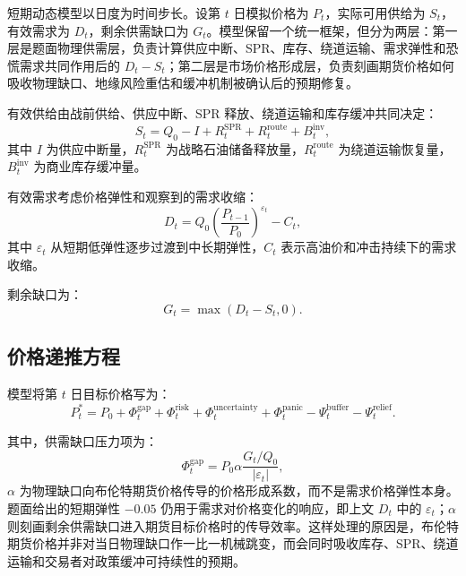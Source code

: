 \documentclass[UTF8,zihao=-4,fontset=fandol]{ctexart}
\begin{document}
短期动态模型以日度为时间步长。设第 \(t\) 日模拟价格为 \(P_t\)，实际可用供给为 \(S_t\)，有效需求为 \(D_t\)，剩余供需缺口为 \(G_t\)。模型保留一个统一框架，但分为两层：第一层是题面物理供需层，负责计算供应中断、SPR、库存、绕道运输、需求弹性和恐慌需求共同作用后的 \(D_t-S_t\)；第二层是市场价格形成层，负责刻画期货价格如何吸收物理缺口、地缘风险重估和缓冲机制被确认后的预期修复。

有效供给由战前供给、供应中断、SPR 释放、绕道运输和库存缓冲共同决定：
\begin{equation}
S_t
  =
  Q_0
  -
  I
  +
  R_t^{\mathrm{SPR}}
  +
  R_t^{\mathrm{route}}
  +
  B_t^{\mathrm{inv}},
\end{equation}
其中 \(I\) 为供应中断量，\(R_t^{\mathrm{SPR}}\) 为战略石油储备释放量，\(R_t^{\mathrm{route}}\) 为绕道运输恢复量，\(B_t^{\mathrm{inv}}\) 为商业库存缓冲量。

有效需求考虑价格弹性和观察到的需求收缩：
\begin{equation}
D_t
  =
  Q_0
  \left(
  \frac{P_{t-1}}{P_0}
  \right)^{\varepsilon_t}
  -
  C_t,
\end{equation}
其中 \(\varepsilon_t\) 从短期低弹性逐步过渡到中长期弹性，\(C_t\) 表示高油价和冲击持续下的需求收缩。

剩余缺口为：
\begin{equation}
G_t = \max(D_t - S_t, 0).
\end{equation}

\subsection{价格递推方程}

模型将第 \(t\) 日目标价格写为：
\begin{equation}
P_t^{*}
=
P_0
+ \Phi_t^{\mathrm{gap}}
+ \Phi_t^{\mathrm{risk}}
+ \Phi_t^{\mathrm{uncertainty}}
+ \Phi_t^{\mathrm{panic}}
- \Psi_t^{\mathrm{buffer}}
- \Psi_t^{\mathrm{relief}}.
\end{equation}

其中，供需缺口压力项为：
\begin{equation}
\Phi_t^{\mathrm{gap}}
  =
  P_0
  \alpha
  \frac{G_t / Q_0}{|\varepsilon_t|},
\end{equation}
\(\alpha\) 为物理缺口向布伦特期货价格传导的价格形成系数，而不是需求价格弹性本身。题面给出的短期弹性 \(-0.05\) 仍用于需求对价格变化的响应，即上文 \(D_t\) 中的 \(\varepsilon_t\)；\(\alpha\) 则刻画剩余供需缺口进入期货目标价格时的传导效率。这样处理的原因是，布伦特期货价格并非对当日物理缺口作一比一机械跳变，而会同时吸收库存、SPR、绕道运输和交易者对政策缓冲可持续性的预期。
\end{document}
